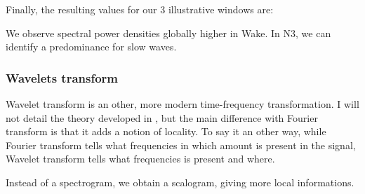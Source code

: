 \documentclass[12pt]{report}
\begin{document}
Finally, the resulting values for our 3 illustrative windows are:
\begin{table}[H]
\centering
{}
\caption{\label{tab:fft_val}Spectral features for Wake, N2 and N3 windows}
\end{table}

We observe spectral power densities globally higher in Wake. In N3, we can identify a predominance for slow waves.

\subsubsection{Wavelets transform}

Wavelet transform is an other, more modern time-frequency transformation. I will not detail the theory developed in \cite{mallat1999wavelet}, but the main difference with Fourier transform is that it adds a notion of locality. To say it an other way, while Fourier transform tells what frequencies in which amount is present in the signal, Wavelet transform tells what frequencies is present and where.

Instead of a spectrogram, we obtain a scalogram, giving more local informations.
\end{document}
